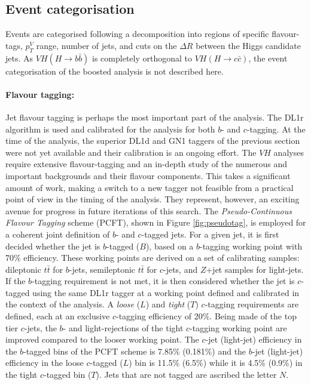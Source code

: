 \vspace{-1cm}

\subsection{Event categorisation}
Events are categorised following a decomposition into regions of specific flavour-tags, $p_T^V$ range, number of jets, and cuts on the $\Delta R$ between the Higgs candidate jets. As  $VH (H\rightarrow b\bar{b})$ is completely orthogonal to $VH (H\rightarrow c\bar{c})$, the event categorisation of the boosted analysis is not described here.

\paragraph{Flavour tagging:} Jet flavour tagging is perhaps the most important part of the analysis. The DL1r algorithm is used and calibrated for the analysis for both $b$- and $c$-tagging. At the time of the analysis, the superior DL1d and GN1 taggers of the previous section were not yet available and their calibration is an ongoing effort. The $VH$ analyses require extensive flavour-tagging and an in-depth study of the numerous and important backgrounds and their flavour components. This takes a significant amount of work, making a switch to a new tagger not feasible from a practical point of view in the timing of the analysis. They represent, however, an exciting avenue for progress in future iterations of this search. The \textit{Pseudo-Continuous Flavour Tagging} scheme (PCFT), shown in Figure \ref{fig:pseudotag}, is employed for a coherent joint definition of $b$- and $c$-tagged jets. For a given jet, it is first decided whether the jet is $b$-tagged ($B$), based on a $b$-tagging working point with 70\% efficiency. These working points are derived on a set of calibrating samples: dileptonic $t\bar{t}$ for $b$-jets, semileptonic $t\bar{t}$ for $c$-jets, and $Z$+jet samples for light-jets. If the $b$-tagging requirement is not met, it is then considered whether the jet is $c$-tagged using the same DL1r tagger at a working point defined and calibrated in the context of the analysis. A \textit{loose} ($L$) and \textit{tight} ($T$) $c$-tagging requirements are defined, each at an exclusive $c$-tagging efficiency of 20\%. Being made of the top tier $c$-jets, the $b$- and light-rejections of the tight $c$-tagging working point are improved compared to the looser working point. The $c$-jet (light-jet) efficiency in the $b$-tagged bins of the PCFT scheme is 7.85\% (0.181\%) and the $b$-jet (light-jet) efficiency in the loose $c$-tagged ($L$) bin is 11.5\% (6.5\%) while it is 4.5\% (0.9\%) in the tight $c$-tagged bin ($T$). Jets that are not tagged are ascribed the letter $N$. \\

